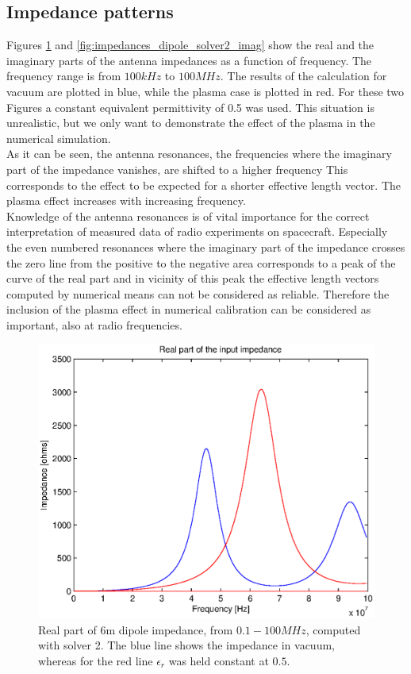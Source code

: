 \documentclass[a4paper,11pt]{article}
\begin{document}
\subsection{Impedance patterns}
Figures \ref{fig:impedances_dipole_solver2_real} and \ref{fig:impedances_dipole_solver2_imag} show the real and the imaginary parts of the antenna impedances as a function of frequency. The frequency range is from $100kHz$ to $100MHz$. The results of the calculation for vacuum are plotted in blue, while the plasma case is plotted in red. For these two Figures a constant equivalent permittivity of 0.5 was used. This situation is unrealistic, but we only want to demonstrate the effect of the plasma in the numerical simulation.\\

As it can be seen, the antenna resonances, the frequencies where the imaginary part of the impedance vanishes, are shifted to a higher frequency This corresponds to the effect to be expected for a shorter effective length vector. The plasma effect increases with increasing frequency.\\

Knowledge of the antenna resonances is of vital importance for the correct interpretation of measured data of radio experiments on spacecraft. Especially the even numbered resonances where the imaginary part of the impedance crosses the zero line from the positive to the negative area corresponds to a peak of the curve of the real part and in vicinity of this peak the effective length vectors computed by numerical means can not be considered as reliable. Therefore the inclusion of the plasma effect in numerical calibration can be considered as important, also at radio frequencies.\\


\begin{figure}
  \includegraphics[width=12cm]{imps_dipole_solver2_real.eps}
\caption{Real part of 6m dipole impedance, from $0.1 - 100 MHz$, computed with solver 2. The blue line shows the impedance in vacuum, whereas for the red line $\epsilon_r$ was held constant at $0.5$.}
\label{fig:impedances_dipole_solver2_real}
\end{figure}
\end{document}
